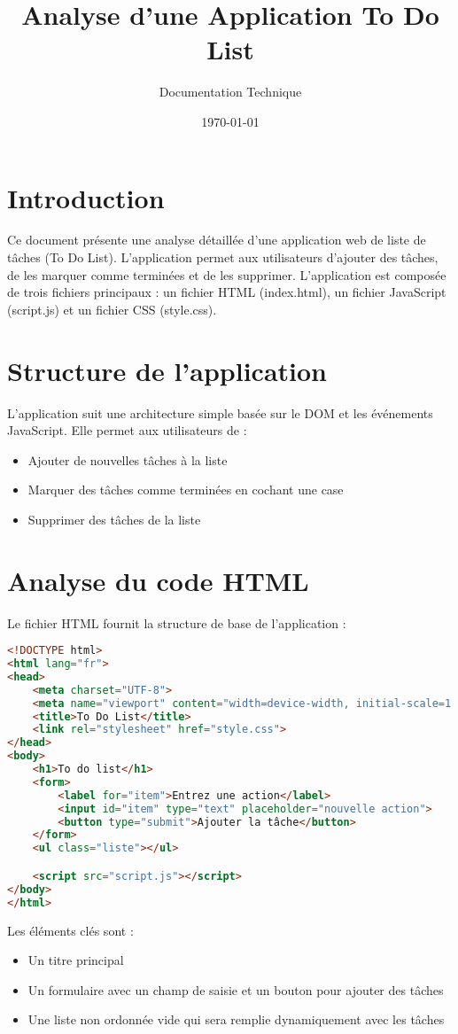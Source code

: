 \documentclass{article}
\title{Analyse d'une Application To Do List}
\author{Documentation Technique}
\date{\today}
\begin{document}
\maketitle

\section{Introduction}
Ce document présente une analyse détaillée d'une application web de liste de tâches (To Do List). L'application permet aux utilisateurs d'ajouter des tâches, de les marquer comme terminées et de les supprimer. L'application est composée de trois fichiers principaux : un fichier HTML (index.html), un fichier JavaScript (script.js) et un fichier CSS (style.css).

\section{Structure de l'application}
L'application suit une architecture simple basée sur le DOM et les événements JavaScript. Elle permet aux utilisateurs de :
\begin{itemize}
    \item Ajouter de nouvelles tâches à la liste
    \item Marquer des tâches comme terminées en cochant une case
    \item Supprimer des tâches de la liste
\end{itemize}

\section{Analyse du code HTML}
Le fichier HTML fournit la structure de base de l'application :

\begin{lstlisting}[language=HTML]
<!DOCTYPE html>
<html lang="fr">
<head>
    <meta charset="UTF-8">
    <meta name="viewport" content="width=device-width, initial-scale=1.0">
    <title>To Do List</title>
    <link rel="stylesheet" href="style.css">
</head>
<body>
    <h1>To do list</h1>
    <form>
        <label for="item">Entrez une action</label>
        <input id="item" type="text" placeholder="nouvelle action">
        <button type="submit">Ajouter la tâche</button>
    </form>
    <ul class="liste"></ul>

    <script src="script.js"></script>
</body>
</html>
\end{lstlisting}

Les éléments clés sont :
\begin{itemize}
    \item Un titre principal
    \item Un formulaire avec un champ de saisie et un bouton pour ajouter des tâches
    \item Une liste non ordonnée vide qui sera remplie dynamiquement avec les tâches
\end{itemize}
\end{document}
